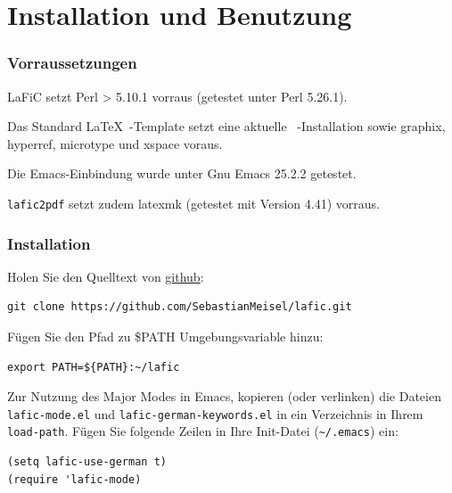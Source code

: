 \documentclass{scrartcl}
\begin{document}
\part{Installation und Benutzung}

\section{Vorraussetzungen}

{LaFiC setzt Perl > 5.10.1 vorraus (getestet unter Perl 5.26.1).\\}

{Das Standard \LaTeX\ -Template setzt eine aktuelle
\XeLaTeX\ -Installation sowie graphix, hyperref, microtype und
xspace voraus.\\}

{Die Emacs-Einbindung wurde unter Gnu Emacs 25.2.2 getestet.\\}

{\texttt{lafic2pdf} setzt zudem latexmk (getestet mit Version 4.41) vorraus.\\}

\section{Installation}
\label{Installation}

{Holen Sie den Quelltext von \href{https://github.com}{github}:\\}

\begin{verbatim}
git clone https://github.com/SebastianMeisel/lafic.git
\end{verbatim}


{Fügen Sie den Pfad zu \$PATH Umgebungsvariable hinzu:\\}

\begin{verbatim}
export PATH=${PATH}:~/lafic
\end{verbatim}


{Zur Nutzung des Major Modes in Emacs, kopieren (oder
verlinken) die Dateien \texttt{lafic-mode.el} und
\texttt{lafic-german-keywords.el} in ein Verzeichnis in Ihrem
\texttt{load-path}. Fügen Sie folgende Zeilen in Ihre Init-Datei
(\texttt{\textasciitilde /.emacs}) ein:\\}

\begin{verbatim}
(setq lafic-use-german t)
(require 'lafic-mode)
\end{verbatim}
\end{document}
